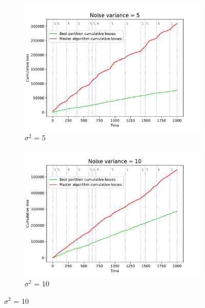 \documentclass[12pt, twoside]{article}
\begin{document}
\begin{figure}[htb]
\begin{subfigure}{0.49\textwidth}
  \includegraphics[width=\linewidth]{noise_5}
  \caption{$\sigma^2$ = 5}
  \label{fig:n_5}
\end{subfigure}
\begin{subfigure}{0.49\textwidth}
  \includegraphics[width=\linewidth]{noise_10}
  \caption{$\sigma^2$ = 10}
  \label{fig:n_10}
\end{subfigure}\hfil %


\end{figure}
\end{document}
